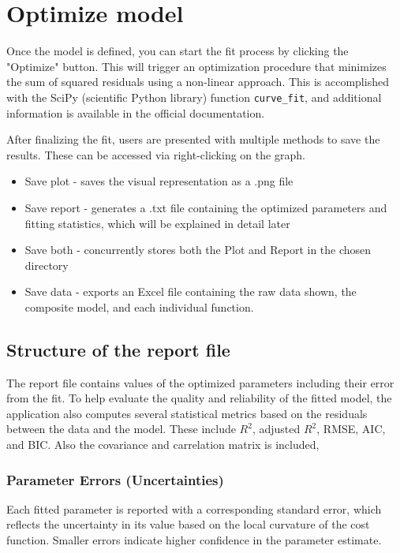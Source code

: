 \section{Optimize model}
Once the model is defined, you can start the fit process by clicking the "Optimize" button. This will trigger an optimization procedure that minimizes the sum of squared residuals using a non-linear approach. This is accomplished with the SciPy (scientific Python library) function \texttt{curve\_fit}, and additional information is available in the official documentation.
\par
After finalizing the fit, users are presented with multiple methods to save the results. These can be accessed via right-clicking on the graph.
\begin{itemize}
    \item Save plot - saves the visual representation as a .png file
    \item Save report - generates a .txt file containing the optimized parameters and fitting statistics, which will be explained in detail later
    \item Save both - concurrently stores both the Plot and Report in the chosen directory
    \item Save data - exports an Excel file containing the raw data shown, the composite model, and each individual function.
\end{itemize}

\subsection{Structure of the report file}
The report file contains values of the optimized parameters including their error from the fit.
To help evaluate the quality and reliability of the fitted model, the application also computes several statistical metrics based on the residuals between the data and the model. These include $R^2$, adjusted $R^2$, RMSE, AIC, and BIC. Also the covariance and carrelation matrix is included,
\par
\subsubsection*{Parameter Errors (Uncertainties)}

Each fitted parameter is reported with a corresponding standard error, which reflects the uncertainty in its value based on the local curvature of the cost function. Smaller errors indicate higher confidence in the parameter estimate.

